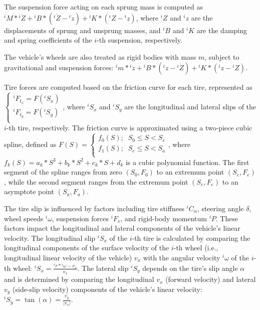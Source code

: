 The suspension force acting on each sprung mass is computed as ${^iM} * {^i{\ddot{Z}}} + {^iB} * ({^i{\dot{Z}}}-{^i{\dot{z}}}) + {^iK} * ({^i{Z}}-{^i{z}})$, where $^iZ$ and $^iz$ are the displacements of sprung and unsprung masses, and $^iB$ and $^iK$ are the damping and spring coefficients of the $i$-th suspension, respectively.

The vehicle's wheels are also treated as rigid bodies with mass $m$, subject to gravitational and suspension forces: ${^im} * {^i{\ddot{z}}} + {^iB} * ({^i{\dot{z}}}-{^i{\dot{Z}}}) + {^iK} * ({^i{z}}-{^i{Z}})$.

\sloppy Tire forces are computed based on the friction curve for each tire, represented as $\left\{\begin{matrix} {^iF_{t_x}} = F(^iS_x) \\{^iF_{t_y}} = F(^iS_y) \\ \end{matrix}\right.$, where $^iS_x$ and $^iS_y$ are the longitudinal and lateral slips of the $i$-th tire, respectively. The friction curve is approximated using a two-piece cubic spline, defined as $F(S) = \left\{\begin{matrix} f_0(S); \;\; S_0 \leq S < S_e \\ f_1(S); \;\; S_e \leq S < S_a \\ \end{matrix}\right.$, where $f_k(S) = a_k*S^3+b_k*S^2+c_k*S+d_k$ is a cubic polynomial function. The first segment of the spline ranges from zero $(S_0,F_0)$ to an extremum point $(S_e,F_e)$, while the second segment ranges from the extremum point $(S_e, F_e)$ to an asymptote point $(S_a, F_a)$.

The tire slip is influenced by factors including tire stiffness $^iC_\alpha$, steering angle $\delta$, wheel speeds $^i\omega$, suspension forces $^iF_s$, and rigid-body momentum $^iP$. These factors impact the longitudinal and lateral components of the vehicle's linear velocity. The longitudinal slip $^iS_x$ of the $i$-th tire is calculated by comparing the longitudinal components of the surface velocity of the $i$-th wheel (i.e., longitudinal linear velocity of the vehicle) $v_x$ with the angular velocity $^i\omega$ of the $i$-th wheel: ${^iS_x} = \frac{{^ir}*{^i\omega}-v_x}{v_x}$. The lateral slip $^iS_y$ depends on the tire's slip angle $\alpha$ and is determined by comparing the longitudinal $v_x$ (forward velocity) and lateral $v_y$ (side-slip velocity) components of the vehicle's linear velocity: ${^iS_y} = \tan(\alpha) = \frac{v_y}{\left| v_x \right|}$.

